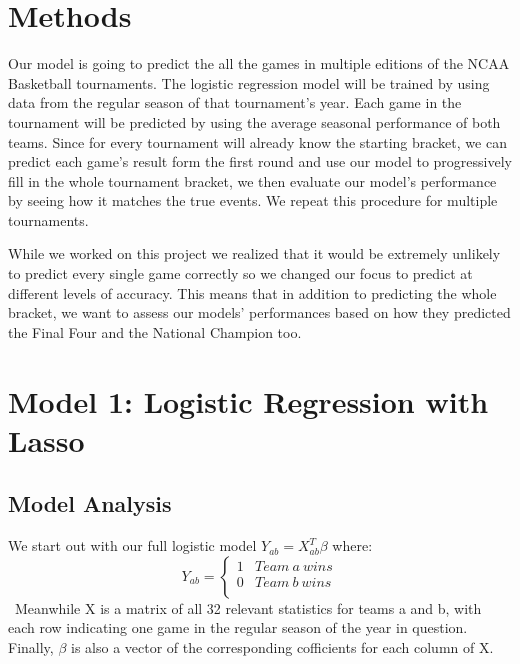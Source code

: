 \documentclass{article} %
\begin{document}


\section{Methods}
\label{gen_inst}

Our model is going to predict the all the games in multiple editions of the NCAA Basketball tournaments. The logistic regression model will be trained by using data from the regular season of that tournament's year. Each game in the tournament will be predicted by using the average seasonal performance of both teams. Since for every tournament will already know the starting bracket, we can predict each game's result form the first round and use our model to progressively fill in the whole tournament bracket, we then evaluate our model's performance by seeing how it matches the true events. We repeat this procedure for multiple tournaments.

While we worked on this project we realized that it would be extremely unlikely to predict every single game correctly so we changed our focus to predict at different levels of accuracy. This means that in addition to predicting the whole bracket, we want to assess our models' performances based on how they predicted the Final Four and the National Champion too.

\section{Model 1: Logistic Regression with Lasso}

\subsection{Model Analysis}

We start out with our full logistic model $Y_{ab} = X_{ab}^T \beta$ where:\
\[ Y_{ab} = \left\{
  \begin{array}{ll}
  1 & Team \ a \ wins \\
  0 &  Team \ b \ wins \\
  \end{array} 
  \right. \]\
Meanwhile X is a matrix of all 32 relevant statistics for teams a and b, with each row indicating one game in the regular season of the year in question. Finally, $\beta$ is also a vector of the corresponding cofficients for each column of X.\
\end{document}
